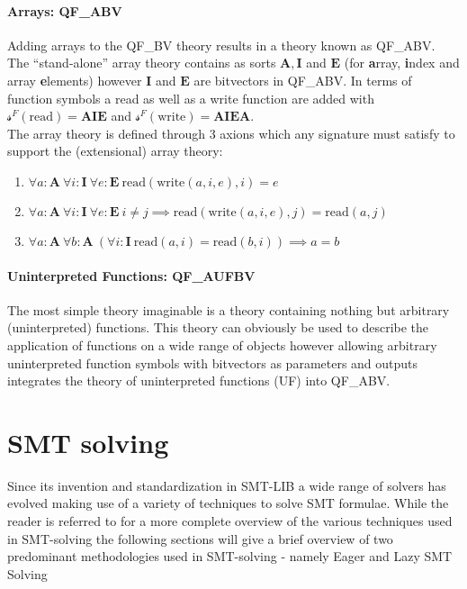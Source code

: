 \paragraph{Arrays: QF\_ABV}
Adding arrays to the QF\_BV theory results in a theory known as QF\_ABV. The \enquote{stand-alone} array theory contains as sorts $\mathbf{A},\mathbf{I}$ and $\mathbf{E}$ (for \textbf{a}rray, \textbf{i}ndex and array \textbf{e}lements) however $\mathbf{I}$ and $\mathbf{E}$ are bitvectors in QF\_ABV. In terms of function symbols a read as well as a write function are added with $\mathcal{s}^F(\text{read})=\mathbf{A}\mathbf{I}\mathbf{E}$ and $\mathcal{s}^F(\text{write})=\mathbf{A}\mathbf{I}\mathbf{E}\mathbf{A}$.\\
The array theory is defined through 3 axions which any signature must satisfy to support the (extensional) array theory:
\begin{enumerate}
    \item $\forall a\colon\!\textbf{A}\ \forall i\colon\!\textbf{I}\ \forall e\colon\!\textbf{E}\ 
    \text{read}\left(\text{write}\left(a,i,e\right), i\right) = e$
    \item $\forall a\colon\!\textbf{A}\ \forall i\colon\!\textbf{I}\ \forall e\colon\!\textbf{E}\ 
    i \neq j \implies \text{read}\left(\text{write}\left(a,i,e\right), j\right)
    = \text{read}\left(a,j\right)$
    \item $\forall a\colon\!\textbf{A}\ \forall b\colon\!\textbf{A}\ 
    \left( \forall i\colon\!\textbf{I}\ \text{read}\left(a,i\right) = \text{read}\left(b,i\right) \right)
    \implies
    a=b
    $
\end{enumerate}

\paragraph{Uninterpreted Functions: QF\_AUFBV}
The most simple theory imaginable is a theory containing nothing but arbitrary (uninterpreted) functions. This theory can obviously be used to describe the application of functions on a wide range of objects however allowing arbitrary uninterpreted function symbols with bitvectors as parameters and outputs integrates the theory of uninterpreted functions (UF) into QF\_ABV.


\section{SMT solving}
Since its invention and standardization in SMT-LIB \cite{BarFT-SMTLIB} a wide range of solvers has evolved making use of a variety of techniques to solve SMT formulae. While the reader is referred to \cite{Barrett-Tinelli-SMT} for a more complete overview of the various techniques used in SMT-solving the following sections will give a brief overview of two predominant methodologies used in SMT-solving - namely Eager and Lazy SMT Solving 
